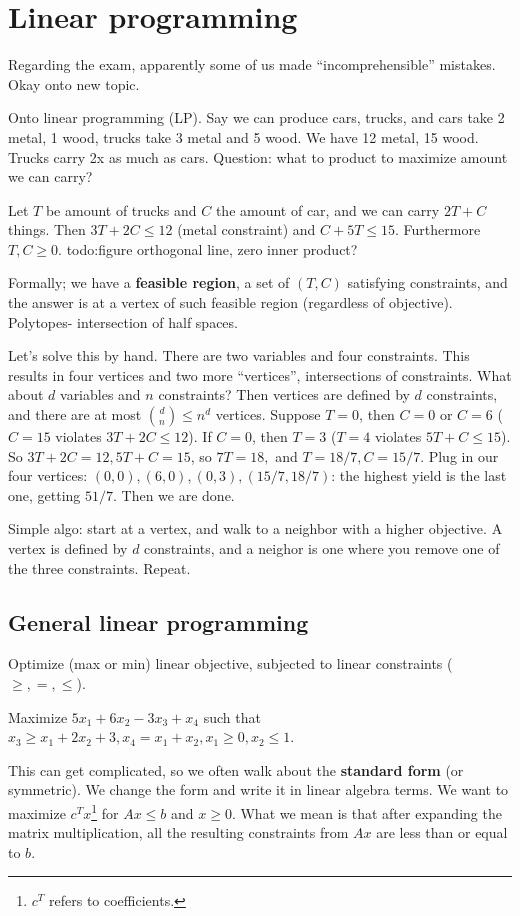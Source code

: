 \section{Linear programming} 
Regarding the exam, apparently some of us made ``incomprehensible'' mistakes. Okay onto new topic.

Onto linear programming (LP). Say we can produce cars, trucks, and cars take 2 metal, 1 wood, trucks take 3 metal and 5 wood. We have 12 metal, 15 wood. Trucks carry 2x as much as cars. Question: what to product to maximize amount we can carry?

Let $T$ be amount of trucks and $C$ the amount of car, and we can carry $2T+C$ things. Then $3T+2C \leq 12$ (metal constraint) and $C+5T \leq 15$. Furthermore $T,C \geq 0$.
{\color{red}todo:figure} orthogonal line, zero inner product?

Formally; we have a \textbf{feasible region}, a set of $(T,C)$ satisfying constraints, and the answer is at a vertex of such feasible region (regardless of objective). Polytopes- intersection of half spaces.

Let's solve this by hand. There are two variables and four constraints. This results in four vertices and two more ``vertices'', intersections of constraints. What about $d$ variables and $n$ constraints? Then vertices are defined by $d$ constraints, and there are at most ${d \choose n}\leq n^d$ vertices. Suppose $T=0$, then $C=0$ or $C=6$ ($C=15$ violates $3T+2C \leq 12$). If $C=0$, then $T=3$ ($T=4$ violates $5T+C \leq 15$). So $3T+2C=12, 5T+C=15$, so $7T=18,$ and $T=18/7,C=15/7$. Plug in our four vertices: $(0,0),(6,0),(0,3),(15/7,18/7)$: the highest yield is the last one, getting $51/7$. Then we are done.

Simple algo: start at a vertex, and walk to a neighbor with a higher objective. A vertex is defined by $d$ constraints, and a neighor is one where you remove one of the three constraints. Repeat.
\subsection{General linear programming}
Optimize (max or min) linear objective, subjected to linear constraints ($\geq ,=,\leq$).
\begin{example}
    Maximize $5x_1+6x_2-3x_3+x_4$ such that $x_3 \geq x_1+2x_2+3, x_4=x_1+x_2,x_1 \geq 0, x_2 \leq 1$.
\end{example}
This can get complicated, so we often walk about the \textbf{standard form} (or symmetric). We change the form and write it in linear algebra terms. We want to maximize $c^Tx$\footnote{$c^T$ refers to coefficients.} for $Ax \leq b$ and $x \geq 0$. What we mean is that after expanding the matrix multiplication, all the resulting constraints from $Ax$ are less than or equal to $b$.

